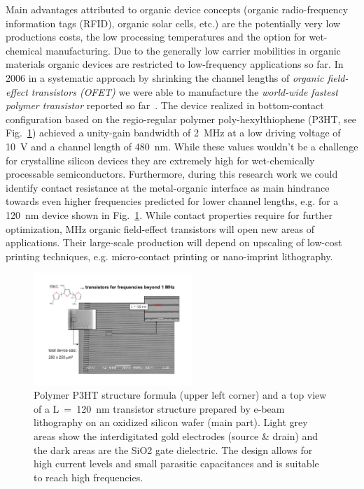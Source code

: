 Main advantages attributed to organic device concepts (organic
radio-frequency information tags (RFID), organic solar cells,
etc.) are the potentially very low productions costs, the low
processing temperatures and the option for wet-chemical
manufacturing. Due to the generally low carrier mobilities in
organic materials organic devices are restricted to low-frequency
applications so far. In 2006 in a systematic approach by shrinking
the channel lengths of {\it organic field-effect transistors
(OFET)} we were able to manufacture the {\it world-wide fastest
polymer transistor} reported so far~\cite{Wagner06-3,Wagner06-4}.
The device realized in bottom-contact configuration based on the
regio-regular polymer poly-hexylthiophene (P3HT, see
Fig.~\ref{fig:wagner1}) achieved a unity-gain bandwidth of 2~MHz
at a low driving voltage of 10~V and a channel length of 480~nm.
While these values wouldn't be a challenge for crystalline silicon
devices they are extremely high for wet-chemically processable
semiconductors. Furthermore, during this research work we could
identify contact resistance at the metal-organic interface as main
hindrance towards even higher frequencies predicted for lower
channel lengths, e.g. for a 120~nm device shown in
Fig.~\ref{fig:wagner1}. While contact properties require for
further optimization, MHz organic field-effect transistors will
open new areas of applications. Their large-scale production will
depend on upscaling of low-cost printing techniques, e.g.
micro-contact printing or nano-imprint lithography.

\begin{figure}[ht]
  \begin{center}
    \includegraphics[width=6cm]{Wagner/Wagner_2006_Fig1.pdf}
    \caption{Polymer P3HT structure formula (upper left corner) and
     a top view of a L~=~120~nm transistor structure prepared by e-beam lithography on an oxidized
      silicon wafer (main part). Light grey areas show the interdigitated gold electrodes
       (source {\&} drain) and the dark areas are the SiO2 gate dielectric.
      The design allows for high current levels and small parasitic capacitances and
       is suitable to reach high frequencies.}
    \label{fig:wagner1}
  \end{center}
\end{figure}

